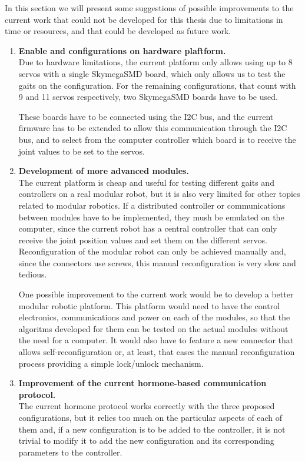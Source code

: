 In this section we will present some suggestions of possible improvements to the current work that could not be developed for this thesis due to limitations in time or resources, and that could be developed as future work.\\

\begin{enumerate}
	\item \textbf{Enable \robotNine and \robotEleven configurations on hardware plaftform.}\\ Due to hardware limitations, the current platform only allows using up to 8 servos with a single SkymegaSMD board, which only allows us to test the gaits on the \robotSeven configuration. For the remaining configurations, that count with 9 and 11 servos respectively, two SkymegaSMD boards have to be used.
	
	These boards have to be connected using the I2C bus, and the current firmware has to be extended to allow this communication through the I2C bus, and to select from the computer controller which board is to receive the joint values to be set to the servos.\\
	
	\item \textbf{Development of more advanced modules.}\\ The current platform is cheap and useful for testing different gaits and controllers on a real modular robot, but it is also very limited for other topics related to modular robotics. If a distributed controller or communications between modules have to be implemented, they mush be emulated on the computer, since the current robot has a central controller that can only receive the joint position values and set them on the different servos. Reconfiguration of the modular robot can only be achieved manually and, since the connectors use screws, this manual reconfiguration is very slow and tedious.
	
	 One possible improvement to the current work would be to develop a better modular robotic platform. This platform would need to have the control electronics, communications and power on each of the modules, so that the algoritms developed for them can be tested on the actual modules without the need for a computer. It would also have to feature a new connector that allows self-reconfiguration or, at least, that eases the manual reconfiguration process providing a simple lock/unlock mechanism.\\
	
	\item \textbf{Improvement of the current hormone-based communication protocol.} \\ The current hormone protocol works correctly with the three proposed configurations, but it relies too much on the particular aspects of each of them and, if a new configuration is to be added to the controller, it is not trivial to modify it to add the new configuration and its corresponding parameters to the controller.  
	

\end{enumerate}

